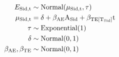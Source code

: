 \documentclass[12pt,preview,border=5mm]{standalone}
\begin{document}
\begin{equation}
    \begin{aligned}
       E_{\mathrm{Sid},\mathrm{t}}           & \sim \text{Normal}( \mu_{\mathrm{Sid},\mathrm{t}}, \tau )                   \\
       \mu_{\mathrm{Sid},\mathrm{t}}         & = \delta + \beta_{\mathrm{AE}} \text{A}_{\mathrm{Sid}}  + \beta_{\mathrm{TE [T_{\mathrm{Sid}}]}} \text{t}  \\
       \tau                   & \sim \text{Exponential}(1)  \\
       \delta                 & \sim \text{Normal}(0, 1)  \\
       \beta_{\mathrm{AE}}, \beta_{\mathrm{TE}} & \sim \text{Normal}(0, 1)
    \end{aligned}
\end{equation}
\end{document}
